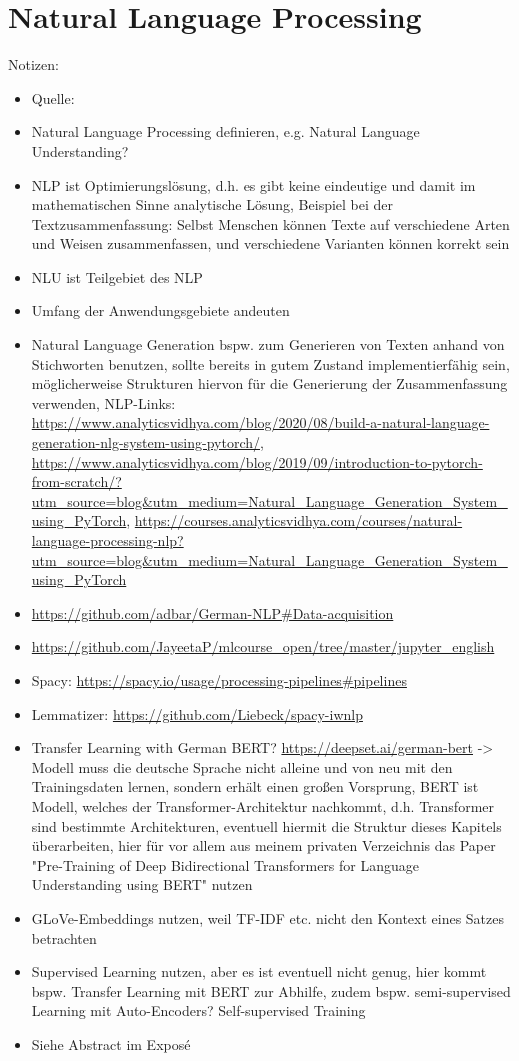 \chapter{Natural Language Processing}
\thispagestyle{fancy}
\label{chap:Natural Language Processing}

Notizen:
\begin{itemize}
	\item Quelle: \cite{NIT19}
	\item Natural Language Processing definieren, e.g. Natural Language Understanding?
	\item NLP ist Optimierungslösung, d.h. es gibt keine eindeutige und damit im mathematischen Sinne analytische Lösung, Beispiel bei der Textzusammenfassung: Selbst Menschen können Texte auf verschiedene Arten und Weisen zusammenfassen, und verschiedene Varianten können korrekt sein
	\item NLU ist Teilgebiet des NLP	
	\item Umfang der Anwendungsgebiete andeuten
	\item Natural Language Generation bspw. zum Generieren von Texten anhand von Stichworten benutzen, sollte bereits in gutem Zustand implementierfähig sein, möglicherweise Strukturen hiervon für die Generierung der Zusammenfassung verwenden, NLP-Links: \url{https://www.analyticsvidhya.com/blog/2020/08/build-a-natural-language-generation-nlg-system-using-pytorch/}, \url{https://www.analyticsvidhya.com/blog/2019/09/introduction-to-pytorch-from-scratch/?utm_source=blog&utm_medium=Natural_Language_Generation_System_using_PyTorch}, \url{https://courses.analyticsvidhya.com/courses/natural-language-processing-nlp?utm_source=blog&utm_medium=Natural_Language_Generation_System_using_PyTorch}
	\item \url{https://github.com/adbar/German-NLP#Data-acquisition}
	\item \url{https://github.com/JayeetaP/mlcourse_open/tree/master/jupyter_english}
	\item Spacy: \url{https://spacy.io/usage/processing-pipelines#pipelines}
	\item Lemmatizer: \url{https://github.com/Liebeck/spacy-iwnlp}
	\item Transfer Learning with German BERT? \url{https://deepset.ai/german-bert} -> Modell muss die deutsche Sprache nicht alleine und von neu  mit den Trainingsdaten lernen, sondern erhält einen großen Vorsprung, BERT ist Modell, welches der Transformer-Architektur nachkommt, d.h. Transformer sind bestimmte Architekturen, eventuell hiermit die Struktur dieses Kapitels überarbeiten, hier für vor allem aus meinem privaten Verzeichnis das Paper "Pre-Training of Deep Bidirectional Transformers for Language Understanding using BERT" nutzen
	\item GLoVe-Embeddings nutzen, weil TF-IDF etc. nicht den Kontext eines Satzes betrachten
	\item Supervised Learning nutzen, aber es ist eventuell nicht genug, hier kommt bspw. Transfer Learning mit BERT zur Abhilfe, zudem bspw. semi-supervised Learning mit Auto-Encoders? Self-supervised Training
	\item Siehe Abstract im Exposé
\end{itemize}


